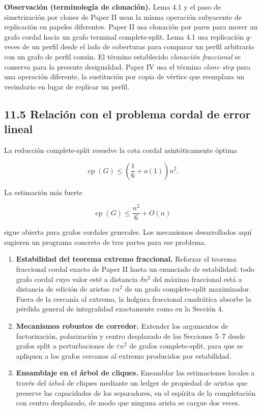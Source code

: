 \documentclass[
  11pt,
]{article}
\begin{document}
\textbf{Observación (terminología de clonación).} Lema 4.1 y el paso de
simetrización por clones de Paper II usan la misma operación subyacente
de replicación en papeles diferentes. Paper II usa clonación por pares
para mover un grafo cordal hacia un grafo terminal complete-split. Lema
4.1 usa replicación \(q\)-veces de un perfil desde el lado de coberturas
para comparar un perfil arbitrario con un grafo de perfil común. El
término establecido \emph{clonación fraccional} se conserva para la
presente desigualdad. Paper IV usa el término \emph{clone step} para una
operación diferente, la sustitución por copia de vértice que reemplaza
un vecindario en lugar de replicar un perfil.

\subsection{11.5 Relación con el problema cordal de error
lineal}\label{relaciuxf3n-con-el-problema-cordal-de-error-lineal}

La reducción complete-split resuelve la cota cordal asintóticamente
óptima

\[
\operatorname{cp}(G)
\le
\left(\frac16+o(1)\right)n^2.
\]

La estimación más fuerte

\[
\operatorname{cp}(G)
\le
\frac{n^2}{6}+O(n)
\]

sigue abierta para grafos cordales generales. Los mecanismos
desarrollados aquí sugieren un programa concreto de tres partes para ese
problema.

\begin{enumerate}
\def\labelenumi{\arabic{enumi}.}
\item
  \textbf{Estabilidad del teorema extremo fraccional.} Reforzar el
  teorema fraccional cordal exacto de Paper II hasta un enunciado de
  estabilidad: todo grafo cordal cuyo valor esté a distancia
  \(\delta n^2\) del máximo fraccional está a distancia de edición de
  aristas \(\varepsilon n^2\) de un grafo complete-split maximizador.
  Fuera de la cercanía al extremo, la holgura fraccional cuadrática
  absorbe la pérdida general de integralidad exactamente como en la
  Sección 4.
\item
  \textbf{Mecanismos robustos de corredor.} Extender los argumentos de
  factorización, polarización y centro desplazado de las Secciones 5--7
  desde grafos split a perturbaciones de \(\varepsilon n^2\) de grafos
  complete-split, para que se apliquen a los grafos cercanos al extremo
  producidos por estabilidad.
\item
  \textbf{Ensamblaje en el árbol de cliques.} Ensamblar las estimaciones
  locales a través del árbol de cliques mediante un ledger de propiedad
  de aristas que preserve las capacidades de los separadores, en el
  espíritu de la completación con centro desplazado, de modo que ninguna
  arista se cargue dos veces.
\end{enumerate}
\end{document}
